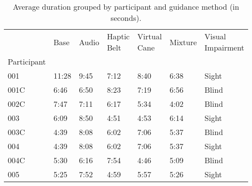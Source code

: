 
\begin{table}[!htb]
\centering
\caption{Average duration grouped by participant and guidance method (in seconds).}
\label{tab:duracao_average_scene_sec}
\begin{tabular}{lllllll}
\toprule
{} &   Base & Audio & Haptic Belt & Virtual Cane & Mixture & Visual Impairment \\
Participant &        &       &             &              &         &                   \\
\midrule
001         &  11:28 &  9:45 &        7:12 &         8:40 &    6:38 &             Sight \\
001C        &   6:46 &  6:50 &        8:23 &         7:19 &    6:56 &             Blind \\
002C        &   7:47 &  7:11 &        6:17 &         5:34 &    4:02 &             Blind \\
003         &   6:09 &  8:50 &        4:51 &         4:53 &    6:14 &             Sight \\
003C        &   4:39 &  8:08 &        6:02 &         7:06 &    5:37 &             Blind \\
004         &   4:39 &  8:08 &        6:02 &         7:06 &    5:37 &             Sight \\
004C        &   5:30 &  6:16 &        7:54 &         4:46 &    5:09 &             Blind \\
005         &   5:25 &  7:52 &        4:59 &         5:57 &    5:26 &             Sight \\
\bottomrule
\end{tabular}
\end{table}

